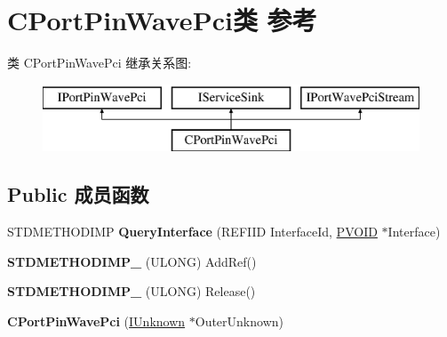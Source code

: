 \hypertarget{class_c_port_pin_wave_pci}{}\section{C\+Port\+Pin\+Wave\+Pci类 参考}
\label{class_c_port_pin_wave_pci}
类 C\+Port\+Pin\+Wave\+Pci 继承关系图\+:\begin{figure}[H]
\begin{center}
\leavevmode
\includegraphics[height=2.000000cm]{class_c_port_pin_wave_pci}
\end{center}
\end{figure}
\subsection*{Public 成员函数}
\begin{DoxyCompactItemize}
\item 
\mbox{\label{class_c_port_pin_wave_pci_ad93119e2fd9a012f9b9345f59fdf0089}} 
S\+T\+D\+M\+E\+T\+H\+O\+D\+I\+MP {\bfseries Query\+Interface} (R\+E\+F\+I\+ID Interface\+Id, \hyperlink{interfacevoid}{P\+V\+O\+ID} $\ast$Interface)
\item 
\mbox{\label{class_c_port_pin_wave_pci_a21ac2072377524c769eeb5104e4dbe11}} 
{\bfseries S\+T\+D\+M\+E\+T\+H\+O\+D\+I\+M\+P\+\_\+} (U\+L\+O\+NG) Add\+Ref()
\item 
\mbox{\label{class_c_port_pin_wave_pci_aa1b91580dfa92347b471c3ba939404e8}} 
{\bfseries S\+T\+D\+M\+E\+T\+H\+O\+D\+I\+M\+P\+\_\+} (U\+L\+O\+NG) Release()
\item 
\mbox{\label{class_c_port_pin_wave_pci_a2deb6a8efdf2a5e91b7ed86f600c405b}} 
{\bfseries C\+Port\+Pin\+Wave\+Pci} (\hyperlink{interface_i_unknown}{I\+Unknown} $\ast$Outer\+Unknown)
\end{DoxyCompactItemize}
